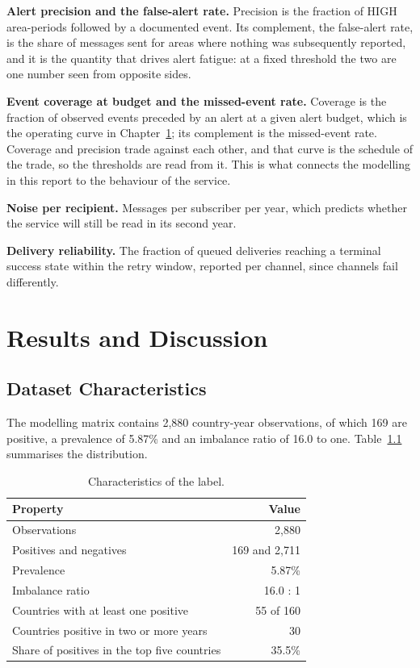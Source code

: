 \documentclass[10pt,openany]{report}
\begin{document}
\textbf{Alert precision and the false-alert rate.} Precision is the fraction of HIGH area-periods
followed by a documented event. Its complement, the false-alert rate, is the share of messages sent
for areas where nothing was subsequently reported, and it is the quantity that drives alert fatigue:
at a fixed threshold the two are one number seen from opposite sides.

\textbf{Event coverage at budget and the missed-event rate.} Coverage is the fraction of observed
events preceded by an alert at a given alert budget, which is the operating curve in
Chapter~\ref{ch:results}; its complement is the missed-event rate. Coverage and precision trade
against each other, and that curve is the schedule of the trade, so the thresholds are read from it.
This is what connects the modelling in this report to the behaviour of the service.

\textbf{Noise per recipient.} Messages per subscriber per year, which predicts whether the service
will still be read in its second year.

\textbf{Delivery reliability.} The fraction of queued deliveries reaching a terminal success state
within the retry window, reported per channel, since channels fail differently.

\chapter{Results and Discussion}
\label{ch:results}

\section{Dataset Characteristics}

The modelling matrix contains 2,880 country-year observations, of which 169 are
positive, a prevalence of 5.87\% and an imbalance ratio of 16.0 to one.
Table~\ref{tab:labels} summarises the distribution.

\begin{table}[htbp]
\centering
\caption{Characteristics of the label.}
\label{tab:labels}
\small
\begin{tabular}{@{}lr@{}}
\toprule
\textbf{Property} & \textbf{Value} \\
\midrule
Observations & 2,880 \\
Positives and negatives & 169 and 2,711 \\
Prevalence & 5.87\% \\
Imbalance ratio & 16.0 : 1 \\
Countries with at least one positive & 55 of 160 \\
Countries positive in two or more years & 30 \\
Share of positives in the top five countries & 35.5\% \\
\bottomrule
\end{tabular}
\end{table}
\end{document}
